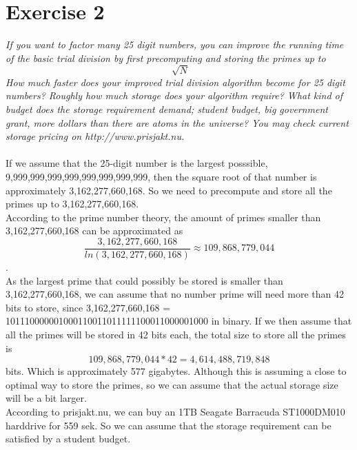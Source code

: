 \documentclass[12pt]{article}
\begin{document}
\section*{Exercise 2}
\textit{ If you want to factor many 25 digit numbers, you can improve the running time of the basic trial division by first precomputing and storing the primes up to \[\sqrt[]{N}\] How much faster does your improved trial division algorithm become for 25 digit numbers? Roughly how much storage does your algorithm require? What kind of budget does the storage requirement demand; student budget, big government grant, more dollars than there are atoms in the universe? You may check current storage pricing on http://www.prisjakt.nu.}
\\
\\
If we assume that the 25-digit number is the largest posssible, 9,999,999,999,999,999,999,999,999, then the square root of that number is approximately 3,162,277,660,168. So we need to precompute and store all the primes up to 3,162,277,660,168.
\\
According to the prime number theory\cite{wiki:primetheorem}, the amount of primes smaller than 3,162,277,660,168 can be approximated as \[ \frac{3,162,277,660,168}{ln(3,162,277,660,168)} \approx 109,868,779,044 \].
\\
As the largest prime that could possibly be stored is smaller than 3,162,277,660,168, we can assume that no number prime will need more than 42 bits to store, since 3,162,277,660,168 = 101110000001000110011011111100011000001000 in binary.
If we then assume that all the primes will be stored in 42 bits each, the total size to store all the primes is \[ 109,868,779,044 * 42 = 4,614,488,719,848 \] bits. Which is approximately 577 gigabytes.
Although this is assuming a close to optimal way to store the primes, so we can assume that the actual storage size will be a bit larger.
\\
According to prisjakt.nu, we can buy an 1TB Seagate Barracuda ST1000DM010 harddrive for 559 sek. So we can assume that the storage requirement can be satisfied by a student budget.

\newpage
\end{document}
